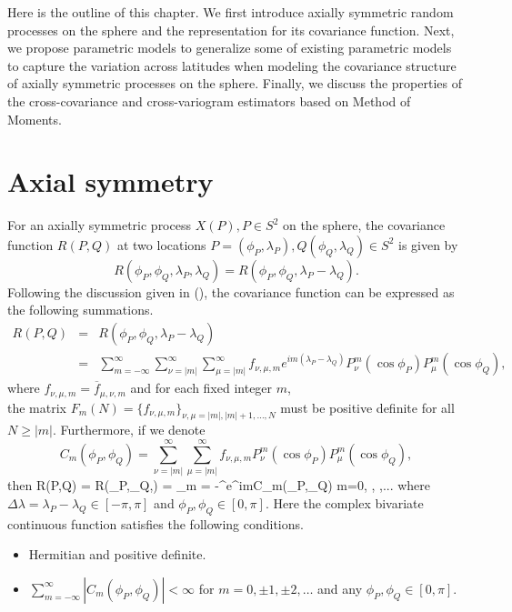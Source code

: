 Here is the outline of this chapter. We first introduce axially symmetric random processes on the sphere and the representation for its covariance function. Next, we propose parametric models to generalize some of existing parametric models to capture the variation across latitudes when modeling the covariance structure of axially symmetric processes on the sphere. Finally, we discuss the properties of the cross-covariance and cross-variogram estimators based on Method of Moments.\\
		
		
		\section{Axial symmetry}

For an axially symmetric process $X(P), P \in S^2$ on the sphere, the covariance function $R(P,Q)$ at two locations $P=(\phi_P, \lambda_P), Q(\phi_Q,\lambda_Q) \in S^2$ is given by 					 \[
R(\phi_P, \phi_Q, \lambda_P, \lambda_Q) = R(\phi_P, \phi_Q, \lambda_P-\lambda_Q).
\]
Following the discussion given in (\cite{Huang2012}), the covariance function can be expressed as the following summations.					
		\begin{eqnarray} \label{axially-symmetry-cov}
			R(P,Q)  & = & R(\phi_P, \phi_Q, \lambda_P-\lambda_Q) \nonumber \\
			& = & \sum_{m=-\infty}^{\infty} \sum_{\nu=|m|}^\infty \sum_{\mu=|m|}^\infty f_{\nu,\mu,m} e^{im (\lambda_P-\lambda_Q)} P_{\nu}^m(\cos \phi_P) P_{\mu}^m (\cos \phi_Q),
		\end{eqnarray}
where $f_{\nu,\mu, m} = \overline{f}_{\mu, \nu, m}$ and for each fixed integer $m$,\\ the matrix $F_m(N) = \{ f_{\nu,\mu,m} \}_{\nu,\mu=|m|,|m|+1, \ldots, N }$ must be positive definite for all $N \ge |m|$. Furthermore, if we denote
\[
C_m(\phi_P, \phi_Q) = \sum_{\nu=|m|}^\infty \sum_{\mu=|m|}^\infty f_{\nu,\mu,m} P_{\nu}^m(\cos \phi_P) P_{\mu}^m (\cos \phi_Q),
\]
then 				
		\beq \label{R(PQ)-01}
		R(P,Q) = R(\phi_P,\phi_Q,\Delta\lambda) = \sum_{m = -\infty}^{\infty}e^{im\Delta\lambda}C_m(\phi_P,\phi_Q) \quad m=0, , ,...
		\eeq
where $\Delta\lambda = \lambda_P - \lambda_Q \in [-\pi, \pi]$ and $\phi_P, \phi_Q \in [0,\pi]$. Here the complex bivariate continuous function \Cm satisfies the following conditions.

		\begin{itemize}
			\item Hermitian and positive definite.
			\item $\sum_{m = -\infty}^{\infty}|C_m(\phi_P,\phi_Q)|<\infty$ for $m=0,\pm 1, \pm  2, \ldots$ and any $\phi_P, \phi_Q \in [0, \pi]$.
		\end{itemize}
				
